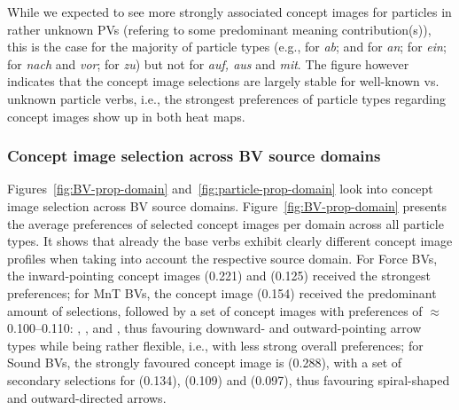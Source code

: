 \documentclass[output=paper]{langsci/langscibook}
\begin{document}
While we expected to see more strongly associated concept images for
particles in rather unknown PVs (refering to some predominant meaning
contribution(s)), this is the case for the majority of particle types
(e.g.,  for \textit{ab}; 
and  for \textit{an};  for
\textit{ein};  for \textit{nach} and \textit{vor};
 for \textit{zu}) but not for \textit{auf, aus} and
\textit{mit}. The figure however indicates that the concept image
selections are largely stable for well-known vs. unknown particle
verbs, i.e., the strongest preferences of particle types regarding
concept images show up in both heat maps.


\subsubsection{Concept image selection across BV source domains}

Figures~\ref{fig:BV-prop-domain} and~\ref{fig:particle-prop-domain}
look into concept image selection across BV source
domains. Figure~\ref{fig:BV-prop-domain} presents the average
preferences of selected concept images per domain across all particle
types. It shows that already the base verbs exhibit clearly different
concept image profiles when taking into account the respective source
domain. For Force BVs, the inward-pointing concept images
 (0.221) and  (0.125) received the
strongest preferences; for MnT BVs, the concept image
 (0.154) received the predominant amount of
selections, followed by a set of concept images with preferences of
$\approx$0.100--0.110: , ,
 and , thus favouring
downward- and outward-pointing arrow types while being rather
flexible, i.e., with less strong overall preferences; for
Sound BVs, the strongly favoured concept image is
 (0.288), with a set of secondary selections for
 (0.134),  (0.109) and
 (0.097), thus favouring spiral-shaped and
outward-directed arrows.
\end{document}
